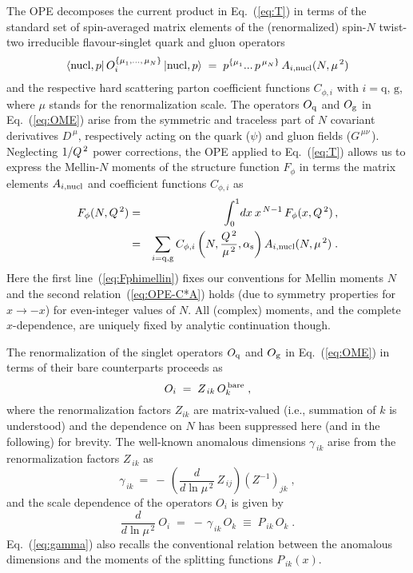 \documentclass[12pt]{article}
\newcommand{\beq}{\begin{equation}}
\newcommand{\eeq}{\end{equation}}
\newcommand{\bea}{\begin{eqnarray}}
\newcommand{\eea}{\end{eqnarray}}
\newcommand{\as}{\alpha_{\rm s}}
\begin{document}
The OPE decomposes the current product in Eq.~(\ref{eq:T}) in terms of the 
standard set of spin-averaged matrix elements of the (renormalized) spin-$N$ 
twist-two irreducible flavour-singlet quark and gluon operators
%
\bea
\label{eq:OME}
  \langle {\rm nucl,}\, p \vert \, O_{i}^{\{\mu^{\,}_1,...,\,\mu^{\,}_N\}}
  \,\vert {\rm nucl,}\, p \rangle 
  \; = \; p^{\{\mu^{\,}_1}...\,p^{\,\mu^{\,}_N\}}\, A_{i,\rm nucl}(N,\mu^{\,2})
\eea
%
and the respective hard scattering parton coefficient functions $C_{\phi,i}$ 
with $i= \mbox{q, g}$, where $\mu$ stands for the renormalization scale.
The operators $O_{\rm q}$ and $O_{\rm g}$ in Eq.~(\ref{eq:OME}) arise from 
the symmetric and traceless part of $N$ covariant derivatives $D^{\,\mu}$,
respectively acting on the quark ($\psi$) and gluon fields ($G^{\,\mu\nu\,}$).
Neglecting $1/{Q^{\, 2}}$ power corrections, the OPE applied to Eq.~(\ref{eq:T}) 
allows us to express the Mellin-$N$ moments of the structure function $F_\phi$ 
in terms the matrix elements $A_{i,\rm nucl}$ and coefficient functions 
$C_{\phi,i}$ as
%
\bea
\label{eq:Fphimellin}
  F_\phi(N,\Qs) & = & \int_0^1 \! dx\: x^{\,N-1} \, F_\phi(x,\Qs) \, ,
\\
&=&
\label{eq:OPE-C*A}
\sum_{i = {\rm q, g}}
  C_{\phi,i} \left(N, \frac{\Qs}{\mu^{\,2}}, \as \right) 
  A_{i,\rm nucl}(N,\mu^{\,2}) \; .
\eea
%
Here the first line~(\ref{eq:Fphimellin}) fixes our conventions for Mellin 
moments $N$ and the second relation~(\ref{eq:OPE-C*A}) holds (due to symmetry 
properties for $x \to -x$) for even-integer values of $N$.
All (complex) moments, and the complete $x$-dependence, are uniquely fixed 
by analytic continuation though.

The renormalization of the singlet operators $O_{\rm q}$ and $O_{\rm g}$ in 
Eq.~(\ref{eq:OME}) in terms of their bare counterparts proceeds as
%
\beq
\label{eq:Oren}
  O_i \; = \; Z_{\,ik}\,O_k^{\,\rm bare} \; ,
\eeq
%
where the renormalization factors $Z_{ik}$ are matrix-valued (i.e., summation 
of $k$ is understood) and the dependence on $N$ has been suppressed here (and 
in the following) for brevity. 
The well-known anomalous dimensions $\gamma_{\,ik}$ arise from the 
renormalization factors $Z_{\,ik}$ as 
%
\beq
\label{eq:gamZ}
 \gamma_{\,ik} \: = \: 
 -\,\left( \frac{d }{d\ln\mu^{\,2} }\: Z_{\,ij} \right) (Z^{-1})_{\!jk} \; ,
\eeq
%
and the scale dependence of the operators $O_{i}$ is given by
%
\beq
\label{eq:gamma}
  \frac{d}{d \ln \mu^{\,2} }\: O_i 
  \; = \; - \,\gamma_{\,ik}\, O_k
  \; \equiv \; P_{\,ik}\, O_k  
  \; .
\eeq
%
Eq.~(\ref{eq:gamma}) also recalls the conventional relation between the 
anomalous dimensions and the moments of the splitting functions $P_{\,ik}(x)$. 
\end{document}
